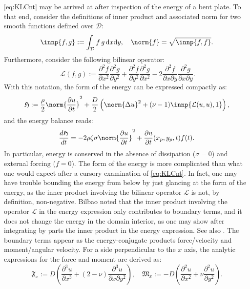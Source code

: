 \eqref{eq:KLCnt} may be arrived at after inspection of the energy of a bent plate. To that end, consider the definitions of inner product and associated norm for two smooth functions defined over $\mathcal{D}$:
\begin{equation}
\innp{f,g} := \int_{\mathcal D} f\,g\,\mathrm{d}x\mathrm{d}y, \quad \norm{f} = \sqrt{\innp{f,f}}.
\end{equation}
Furthermore, consider the following bilinear operator:
\begin{equation}\
\mathcal{L}(f,g) := \frac{\partial^2 f}{\partial x^2}\frac{\partial^2 g}{\partial y^2} + \frac{\partial^2 f}{\partial y^2}\frac{\partial^2 g}{\partial x^2} - 2\frac{\partial^2 f}{\partial x\partial y}\frac{\partial^2 g}{\partial x\partial y}.
\end{equation}
With this notation, the form of the energy can be expressed compactly as:
\begin{equation}\label{eq:CntEn}
\mathfrak{H} := \frac{\rho}{2}\norm{\frac{\partial u}{\partial t}}^2 + \frac{D}{2}\left(\norm{\Delta u}^2 + (\nu-1)\innp{\mathcal{L}(u,u),1}\right),
\end{equation}
and the energy balance reads:
\begin{equation}\label{eq:EnBalCnt}
\frac{d \mathfrak{H}}{dt} = -2\rho\zeta\sigma\norm{ \frac{\partial u}{\partial t}}^2 + \frac{\partial u}{\partial t}(x_p,y_p,t)f(t).
\end{equation}
In particular, energy is conserved in the absence of dissipation ($\sigma = 0$) and external forcing ($f=0$).
The form of the energy is more complicated than what one would expect after a cursory examination of \eqref{eq:KLCnt}. In fact, one may have trouble bounding the energy from below by just glancing at the form of the energy, as the inner product involving the bilinear operator $\mathcal L$ is not, by definition, non-negative. Bilbao \cite[Chapter 11]{bilbao_numerical_2009} noted that the inner product involving the operator $\mathcal L$ in the energy expression only contributes to boundary terms, and it does not change the energy in the domain interior, as one may show after integrating by parts the inner product in the energy expression. See also \cite{thomas2008geometrically}. The boundary terms appear as the energy-conjugate products force/velocity and moment/angular velocity. For a side perpendicular to the $x$ axis, the analytic expressions for the force and moment are derived as:
\begin{equation}
\mathfrak{F}_x := D \left(\frac{\partial^3 u}{\partial x^3} + (2-\nu)\frac{\partial^3 u}{\partial x \partial y^2}\right), \quad \mathfrak{M}_x := -D\left(\frac{\partial^2 u}{\partial x^2} + \nu \frac{\partial^2 u}{\partial y^2} \right).
\end{equation}

